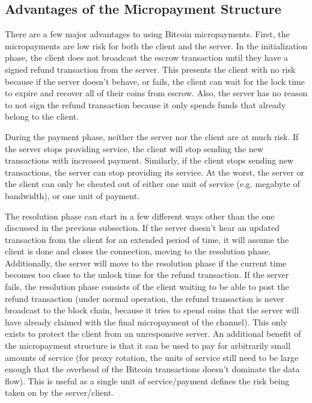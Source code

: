 \subsection{Advantages of the Micropayment Structure}

There are a few major advantages to using Bitcoin micropayments. First, the micropayments are low risk for both the client and the server. In the initialization phase, the client does not broadcast the escrow transaction until they have a signed refund transaction from the server. This presents the client with no risk because if the server doesn't behave, or fails, the client can wait for the lock time to expire and recover all of their coins from escrow. Also, the server has no reason to not sign the refund transaction because it only spends funds that already belong to the client.

During the payment phase, neither the server nor the client are at much risk. If the server stops providing service, the client will stop sending the new transactions with increased payment. Similarly, if the client stops sending new transactions, the server can stop providing its service. At the worst, the server or the client can only be cheated out of either one unit of service (e.g. megabyte of bandwidth), or one unit of payment.

The resolution phase can start in a few different ways other than the one discussed in the previous subsection. If the server doesn't hear an updated transaction from the client for an extended period of time, it will assume the client is done and closes the connection, moving to the resolution phase. Additionally, the server will move to the resolution phase if the current time becomes too close to the unlock time for the refund transaction. If the server fails, the resolution phase consists of the client waiting to be able to post the refund transaction (under normal operation, the refund transaction is never broadcast to the block chain, because it tries to spend coins that the server will have already claimed with the final micropayment of the channel). This only exists to protect the client from an unresponsive server. An additional benefit of the micropayment structure is that it can be used to pay for arbitrarily small amounts of service (for proxy rotation, the units of service still need to be large enough that the overhead of the Bitcoin transactions doesn't dominate the data flow). This is useful as a single unit of service/payment defines the risk being taken on by the server/client.

